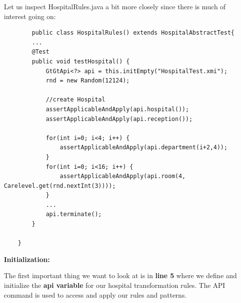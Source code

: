 {%







Let us inspect HospitalRules.java a bit more closely since there is much of interest going on:\newline

\begin{lstlisting}	
		public class HospitalRules() extends HospitalAbstractTest{
		...
		@Test
		public void testHospital() {
			GtGtApi<?> api = this.initEmpty("HospitalTest.xmi");
			rnd = new Random(12124);
		
			//create Hospital
			assertApplicableAndApply(api.hospital());
			assertApplicableAndApply(api.reception());
			
			for(int i=0; i<4; i++) {
				assertApplicableAndApply(api.department(i+2,4));
			}
			for(int i=0; i<16; i++) {
				assertApplicableAndApply(api.room(4, Carelevel.get(rnd.nextInt(3))));
			}
			...
			api.terminate();
		}
		
	}
\end{lstlisting}

\textbf{Initialization:}

The first important thing we want to look at is in \textbf{line 5} where we define and initialize the \textbf{api variable} for our hospital transformation rules.\newline
The API command is used to access and apply our rules and patterns.\newline



}
